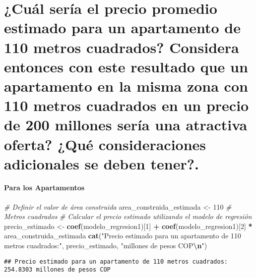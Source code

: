 \documentclass[
]{article}
\newenvironment{Shaded}{\begin{snugshade}}{\end{snugshade}}
\newcommand{\CommentTok}[1]{\textcolor[rgb]{0.56,0.35,0.01}{\textit{#1}}}
\newcommand{\DecValTok}[1]{\textcolor[rgb]{0.00,0.00,0.81}{#1}}
\newcommand{\FunctionTok}[1]{\textcolor[rgb]{0.13,0.29,0.53}{\textbf{#1}}}
\newcommand{\NormalTok}[1]{#1}
\newcommand{\OtherTok}[1]{\textcolor[rgb]{0.56,0.35,0.01}{#1}}
\newcommand{\SpecialCharTok}[1]{\textcolor[rgb]{0.81,0.36,0.00}{\textbf{#1}}}
\newcommand{\StringTok}[1]{\textcolor[rgb]{0.31,0.60,0.02}{#1}}
\begin{document}
\section{\texorpdfstring{\textbf{¿Cuál sería el precio promedio estimado
para un apartamento de 110 metros cuadrados? Considera entonces con este
resultado que un apartamento en la misma zona con 110 metros cuadrados
en un precio de 200 millones sería una atractiva oferta? ¿Qué
consideraciones adicionales se deben
tener?.}}{¿Cuál sería el precio promedio estimado para un apartamento de 110 metros cuadrados? Considera entonces con este resultado que un apartamento en la misma zona con 110 metros cuadrados en un precio de 200 millones sería una atractiva oferta? ¿Qué consideraciones adicionales se deben tener?.}}\label{cuuxe1l-seruxeda-el-precio-promedio-estimado-para-un-apartamento-de-110-metros-cuadrados-considera-entonces-con-este-resultado-que-un-apartamento-en-la-misma-zona-con-110-metros-cuadrados-en-un-precio-de-200-millones-seruxeda-una-atractiva-oferta-quuxe9-consideraciones-adicionales-se-deben-tener.}

\paragraph{Para los Apartamentos}\label{para-los-apartamentos-1}

\begin{Shaded}
\begin{Highlighting}[]
\CommentTok{\# Definir el valor de área construida}
\NormalTok{area\_construida\_estimada }\OtherTok{\textless{}{-}} \DecValTok{110}  \CommentTok{\# Metros cuadrados}
\CommentTok{\# Calcular el precio estimado utilizando el modelo de regresión}
\NormalTok{precio\_estimado }\OtherTok{\textless{}{-}} \FunctionTok{coef}\NormalTok{(modelo\_regresion1)[}\DecValTok{1}\NormalTok{] }\SpecialCharTok{+} \FunctionTok{coef}\NormalTok{(modelo\_regresion1)[}\DecValTok{2}\NormalTok{] }\SpecialCharTok{*}\NormalTok{ area\_construida\_estimada}
\FunctionTok{cat}\NormalTok{(}\StringTok{"Precio estimado para un apartamento de 110 metros cuadrados:"}\NormalTok{, precio\_estimado, }\StringTok{"millones de pesos COP}\SpecialCharTok{\textbackslash{}n}\StringTok{"}\NormalTok{)}
\end{Highlighting}
\end{Shaded}

\begin{verbatim}
## Precio estimado para un apartamento de 110 metros cuadrados: 254.8303 millones de pesos COP
\end{verbatim}
\end{document}
